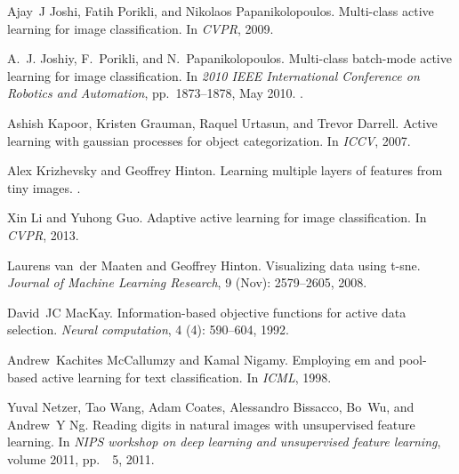 \documentclass{article} %
\begin{document}
\begin{thebibliography}{40}
Ajay~J Joshi, Fatih Porikli, and Nikolaos Papanikolopoulos.
\newblock Multi-class active learning for image classification.
\newblock In \emph{CVPR}, 2009.

A.~J. Joshiy, F.~Porikli, and N.~Papanikolopoulos.
\newblock Multi-class batch-mode active learning for image classification.
\newblock In \emph{2010 IEEE International Conference on Robotics and
  Automation}, pp.\  1873--1878, May 2010.
\newblock {}.

Ashish Kapoor, Kristen Grauman, Raquel Urtasun, and Trevor Darrell.
\newblock Active learning with gaussian processes for object categorization.
\newblock In \emph{ICCV}, 2007.

Alex Krizhevsky and Geoffrey Hinton.
\newblock Learning multiple layers of features from tiny images.
.

Xin Li and Yuhong Guo.
\newblock Adaptive active learning for image classification.
\newblock In \emph{CVPR}, 2013.

Laurens van~der Maaten and Geoffrey Hinton.
\newblock Visualizing data using t-sne.
\newblock \emph{Journal of Machine Learning Research}, 9
  (Nov): 2579--2605, 2008.

David~JC MacKay.
\newblock Information-based objective functions for active data selection.
\newblock \emph{Neural computation}, 4 (4): 590--604, 1992.

Andrew~Kachites McCallumzy and Kamal Nigamy.
\newblock Employing em and pool-based active learning for text classification.
\newblock In \emph{ICML}, 1998.

Yuval Netzer, Tao Wang, Adam Coates, Alessandro Bissacco, Bo~Wu, and Andrew~Y
  Ng.
\newblock Reading digits in natural images with unsupervised feature learning.
\newblock In \emph{NIPS workshop on deep learning and unsupervised feature
  learning}, volume 2011, pp.\ ~5, 2011.


\end{thebibliography}
\end{document}

